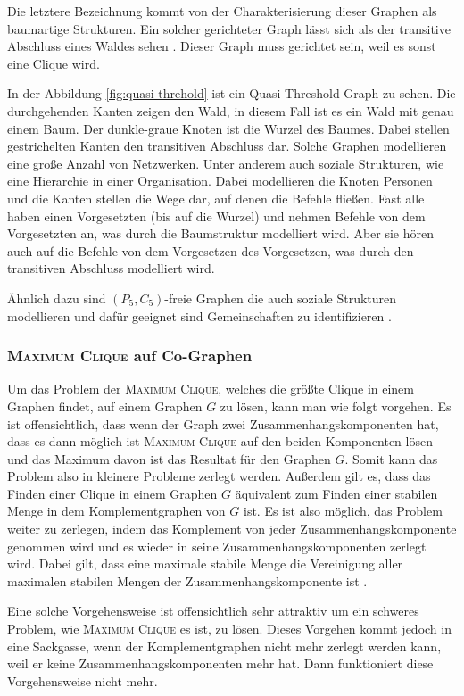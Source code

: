 \documentclass[12pt,a4paper,onecolumn,oneside,titlepage]{article}
\begin{document}
Die letztere Bezeichnung kommt von der Charakterisierung dieser Graphen als baumartige Strukturen. Ein solcher gerichteter Graph lässt sich als der transitive Abschluss eines Waldes sehen \cite{BrandesHSW15}. Dieser Graph muss gerichtet sein, weil es sonst eine Clique wird.

In der Abbildung \ref{fig:quasi-threhold} ist  ein Quasi-Threshold Graph zu sehen. Die durchgehenden Kanten zeigen den Wald, in diesem Fall ist es ein Wald mit genau einem Baum. Der dunkle-graue Knoten ist die Wurzel des Baumes.  Dabei stellen gestrichelten Kanten den transitiven Abschluss dar.
Solche Graphen modellieren eine große Anzahl von Netzwerken. Unter anderem auch soziale Strukturen, wie eine Hierarchie in einer Organisation. Dabei modellieren die Knoten Personen und die Kanten stellen die Wege dar, auf denen die Befehle fließen. Fast alle haben einen Vorgesetzten (bis auf die Wurzel) und nehmen Befehle von dem Vorgesetzten an, was durch die Baumstruktur modelliert wird. Aber sie hören auch auf die Befehle von dem Vorgesetzen des Vorgesetzen, was durch den transitiven Abschluss modelliert wird\cite{NastosG13}. 

Ähnlich dazu sind $(P_5,C_5)$-freie Graphen die auch soziale Strukturen modellieren und dafür geeignet sind Gemeinschaften zu identifizieren \cite{Schoch15}. 

\subsubsection{\textsc{Maximum Clique} auf Co-Graphen}
Um das Problem der \textsc{Maximum Clique}, welches die größte Clique in einem Graphen findet, auf einem Graphen $G$ zu lösen, kann man wie folgt vorgehen. Es ist offensichtlich, dass wenn der Graph zwei Zusammenhangskomponenten hat, dass es dann möglich ist \textsc{Maximum Clique} auf den beiden Komponenten lösen und das Maximum davon ist das Resultat für den Graphen $G$. Somit kann das Problem also in kleinere Probleme zerlegt werden.
Außerdem gilt es, dass das Finden einer Clique in einem Graphen $G$ äquivalent zum Finden einer stabilen Menge in dem Komplementgraphen von $G$ ist.
Es ist also möglich, das Problem weiter zu zerlegen, indem das Komplement von jeder Zusammenhangskomponente genommen wird und es wieder in seine Zusammenhangskomponenten zerlegt wird. Dabei gilt, dass eine maximale stabile Menge die Vereinigung aller maximalen stabilen Mengen der Zusammenhangskomponente ist \cite{Nastos06}. 

Eine solche Vorgehensweise ist offensichtlich sehr attraktiv um ein schweres Problem, wie \textsc{Maximum Clique} es ist, zu lösen. Dieses Vorgehen kommt jedoch in eine Sackgasse, wenn der Komplementgraphen nicht mehr zerlegt werden kann, weil er keine Zusammenhangskomponenten mehr hat.
Dann funktioniert diese Vorgehensweise nicht mehr. 
\end{document}
